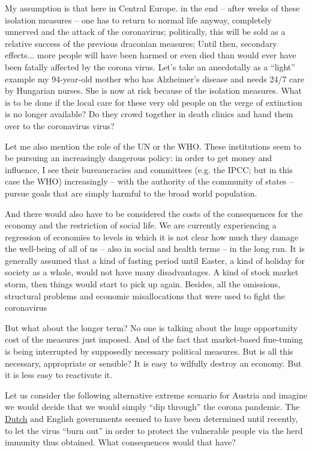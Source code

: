 \documentclass[%
 reprint,
 showpacs,
 showkeys,
 preprintnumbers,
 amsmath,amssymb,
 aps,
  pra,
  longbibliography,
 floatfix,
 ]{revtex4-1}
\begin{document}
My assumption is that here in Central Europe.
in the end -- after weeks of these isolation measures -- one has to return to normal life anyway, completely unnerved
and the attack of the coronavirus;
politically, this will be sold as a relative success of the previous draconian measures;
Until then, secondary effects...
more people will have been harmed or even died
than would ever have been fatally affected by the corona virus.
Let's take an anecdotally as a ``light'' example my 94-year-old mother who has Alzheimer's disease and needs 24/7 care by Hungarian nurses.
She is now at risk because of the isolation measures. What is to be done if the local care for these very old people on the verge of extinction is no longer available?
Do they crowd together in death clinics and hand them over to the coronavirus virus?

Let me also mention the role of the UN or the WHO.
These institutions seem to be pursuing an increasingly dangerous policy:
in order to get money and influence, I see their bureaucracies and committees (e.g. the IPCC; but in this case the WHO) increasingly
-- with the authority of the community of states -- pursue goals that are simply harmful to the broad world population.

And there would also have to be considered the costs of the consequences for the economy and the restriction of social life.
We are currently experiencing a regression of economies to levels
in which it is not clear how much they damage the well-being of all of us -- also in social and health terms -- in the long run.
It is generally assumed that a kind of fasting period until Easter, a kind of holiday for society as a whole, would not have many disadvantages.
A kind of stock market storm, then things would start to pick up again. Besides, all the omissions, structural problems and economic misallocations
that were used to fight the coronavirus

But what about the longer term?
No one is talking about the huge opportunity cost of the measures just imposed.
And of the fact that market-based fine-tuning is being interrupted by supposedly necessary political measures.
But is all this necessary, appropriate or sensible?
It is easy to wilfully destroy an economy. But it is less easy to reactivate it.

Let us consider the following alternative extreme scenario for Austria and imagine
we would decide that we would simply ``dip through'' the corona pandemic.
The \href{https://taz.de/Niederlande-Anderer-Ansatz-zu-Corona/!5672956/}{Dutch} and English governments seemed to have been determined until recently,
to let the virus ``burn out'' in order to protect the vulnerable people via the herd immunity thus obtained.
What consequences would that have?
\end{document}
